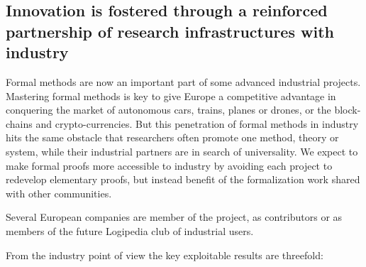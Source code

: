 \subsection{Innovation is fostered through a reinforced partnership of
research infrastructures with industry}

Formal methods are now an important part of some advanced industrial
projects. Mastering formal methods is key to give Europe a competitive
advantage in conquering the market of autonomous cars, trains, planes
or drones, or the block-chains and crypto-currencies. But this
penetration of formal methods in industry hits the same obstacle that
researchers often promote one method, theory or system, while their
industrial partners are in search of universality. We expect to make
formal proofs more accessible to industry by avoiding each project to
redevelop elementary proofs, but instead benefit of the formalization
work shared with other communities.

Several European companies are member of the project,
as contributors or as members of the future Logipedia
club of industrial users.

From the industry point of view the key exploitable results are threefold:

